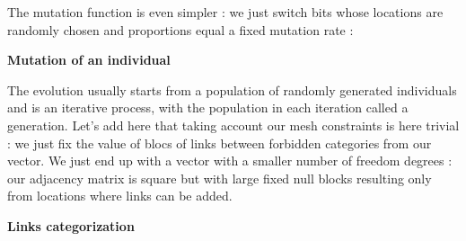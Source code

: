\documentclass{iSWAGArticle}
\begin{document}
\begin{center}
\end{center}
The mutation function is even simpler : we just switch bits whose locations are randomly chosen
and proportions equal a fixed mutation rate : 
\\\newline
\begin{center}
\textbf{\large Mutation of an individual}
\end{center}
\begin{center}
\end{center}
The evolution usually starts from a population of randomly generated individuals and is an iterative process, with the population in each iteration called a generation.
Let's add here that taking account our mesh constraints is here trivial : we just fix the value of blocs of links between forbidden categories from our
vector. We just end up with a vector with a smaller number of freedom degrees : our adjacency matrix is square but with large fixed null blocks resulting only from locations where links can be added.
\begin{center}
\textbf{\large Links categorization}
\end{center}
\begin{center}
\end{center}
\end{document}
